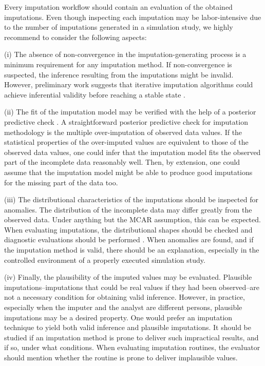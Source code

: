 \documentclass[bimj,fleqn]{w-art}
\begin{document}
Every imputation workflow should contain an evaluation of the obtained imputations. Even though inspecting each imputation may be labor-intensive due to the number of imputations generated in a simulation study, we highly recommend to consider the following aspects:

(i) The absence of non-convergence in the imputation-generating process is a minimum requirement for any imputation method. If non-convergence is suspected, the inference resulting from the imputations might be invalid. However, preliminary work suggests that iterative imputation algorithms could achieve inferential validity before reaching a stable state \citep{ober21}. 

(ii) The fit of the imputation model may be verified with the help of a posterior predictive check \citep[][]{nguy17, zhao22}. A straightforward posterior predictive check for imputation methodology is the multiple over-imputation of observed data values. If the statistical properties of the over-imputed values are equivalent to those of the observed data values, one could infer that the imputation model fits the observed part of the incomplete data reasonably well. Then, by extension, one could assume that the imputation model might be able to produce good imputations for the missing part of the data too.

(iii) The distributional characteristics of the imputations should be inspected for anomalies. The distribution of the incomplete data may differ greatly from the observed data. Under anything but the MCAR assumption, this can be expected. When evaluating imputations, the distributional shapes should be checked and diagnostic evaluations should be performed \citep[see][for a detailed overview of diagnostic evaluation for multivariate imputations]{abayomi2008diagnostics}. When anomalies are found, and if the imputation method is valid, there should be an explanation, especially in the controlled environment of a properly executed simulation study. 

(iv) Finally, the plausibility of the imputed values may be evaluated. Plausible imputations--imputations that could be real values if they had been observed--are not a necessary condition for obtaining valid inference. However, in practice, especially when the imputer and the analyst are different persons, plausible imputations may be a desired property. One would prefer an imputation technique to yield both valid inference and plausible imputations. It should be studied if an imputation method is prone to deliver such impractical results, and if so, under what conditions. When evaluating imputation routines, the evaluator should mention whether the routine is prone to deliver implausible values. 
\end{document}
